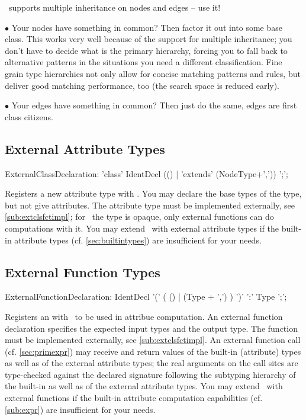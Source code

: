 \begin{note}
\GrG~supports multiple inheritance on nodes and edges -- use it!

$\bullet$ Your nodes have something in common?
Then factor it out into some base class.
This works very well because of the support for multiple inheritance; you don't have to decide what is the primary hierarchy, forcing you to fall back to alternative patterns in the situations you need a different classification.
Fine grain type hierarchies not only allow for concise matching patterns and rules,
but deliver good matching performance, too (the search space is reduced early).

$\bullet$ Your edges have something in common?
Then just do the same, edges are first class citizens.
\end{note}

\subsection{External Attribute Types}\label{sub:extcls}
\begin{rail}
  ExternalClassDeclaration: 'class' IdentDecl (() | 'extends' (NodeType+',')) ';';
\end{rail}
Registers a new attribute type with \GrG. You may declare the base types of the type, but not give attributes. The attribute type must be implemented externally, see \ref{sub:extclsfctimpl}; for \GrG~the type is opaque, only external functions can do computations with it. You may extend \GrG~with external attribute types if the built-in attribute types (cf. \ref{sec:builtintypes}) are insufficient for your needs.

\subsection{External Function Types}\label{sub:extfct}
\begin{rail}
  ExternalFunctionDeclaration: IdentDecl '(' ( () | (Type + ',') ) ')' ':' Type ';';
\end{rail}
Registers an  with \GrG~to be used in attribue computation.
An external function declaration specifies the expected input types and the output type. The function must be implemented externally, see \ref{sub:extclsfctimpl}.
An external function call (cf. \ref{sec:primexpr}) may receive and return values of the built-in (attribute) types as well as of the external attribute types; the real arguments on the call sites are type-checked against the declared signature following the subtyping hierarchy of the built-in as well as of the external attribute types.
You may extend \GrG~with external functions if the built-in attribute computation capabilities (cf. \ref{sub:expr}) are insufficient for your needs.

